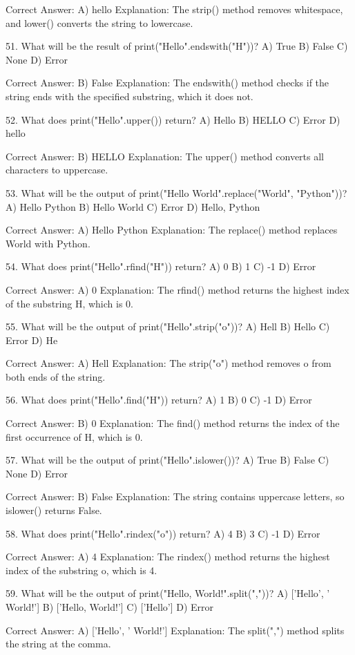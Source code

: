 Correct Answer: A) hello
Explanation: The strip() method removes whitespace, and lower() converts the string to lowercase.

51. What will be the result of print("Hello".endswith("H"))?
A) True
B) False
C) None
D) Error

Correct Answer: B) False
Explanation: The endswith() method checks if the string ends with the specified substring, which it does not.

52. What does print("Hello".upper()) return?
A) Hello
B) HELLO
C) Error
D) hello

Correct Answer: B) HELLO
Explanation: The upper() method converts all characters to uppercase.

53. What will be the output of print("Hello World".replace("World", "Python"))?
A) Hello Python
B) Hello World
C) Error
D) Hello, Python

Correct Answer: A) Hello Python
Explanation: The replace() method replaces World with Python.

54. What does print("Hello".rfind("H")) return?
A) 0
B) 1
C) -1
D) Error

Correct Answer: A) 0
Explanation: The rfind() method returns the highest index of the substring H, which is 0.

55. What will be the output of print("Hello".strip("o"))?
A) Hell
B) Hello
C) Error
D) He

Correct Answer: A) Hell
Explanation: The strip("o") method removes o from both ends of the string.

56. What does print("Hello".find("H")) return?
A) 1
B) 0
C) -1
D) Error

Correct Answer: B) 0
Explanation: The find() method returns the index of the first occurrence of H, which is 0.

57. What will be the output of print("Hello".islower())?
A) True
B) False
C) None
D) Error

Correct Answer: B) False
Explanation: The string contains uppercase letters, so islower() returns False.

58. What does print("Hello".rindex("o")) return?
A) 4
B) 3
C) -1
D) Error

Correct Answer: A) 4
Explanation: The rindex() method returns the highest index of the substring o, which is 4.

59. What will be the output of print("Hello, World!".split(","))?
A) ['Hello', ' World!']
B) ['Hello, World!']
C) ['Hello']
D) Error

Correct Answer: A) ['Hello', ' World!']
Explanation: The split(",") method splits the string at the comma.

